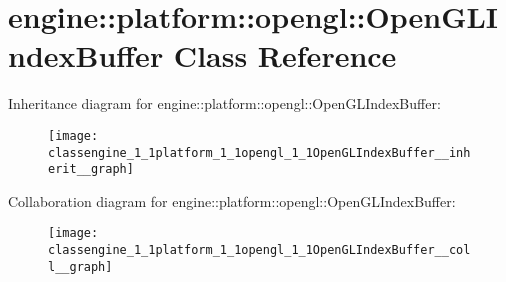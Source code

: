 \hypertarget{classengine_1_1platform_1_1opengl_1_1OpenGLIndexBuffer}{}\section{engine\+:\+:platform\+:\+:opengl\+:\+:Open\+G\+L\+Index\+Buffer Class Reference}
\label{classengine_1_1platform_1_1opengl_1_1OpenGLIndexBuffer}


Inheritance diagram for engine\+:\+:platform\+:\+:opengl\+:\+:Open\+G\+L\+Index\+Buffer\+:\nopagebreak
\begin{figure}[H]
\begin{center}
\leavevmode
\texttt{[image: classengine\_1\_1platform\_1\_1opengl\_1\_1OpenGLIndexBuffer\_\_inherit\_\_graph]}
\end{center}
\end{figure}


Collaboration diagram for engine\+:\+:platform\+:\+:opengl\+:\+:Open\+G\+L\+Index\+Buffer\+:\nopagebreak
\begin{figure}[H]
\begin{center}
\leavevmode
\texttt{[image: classengine\_1\_1platform\_1\_1opengl\_1\_1OpenGLIndexBuffer\_\_coll\_\_graph]}
\end{center}
\end{figure}
